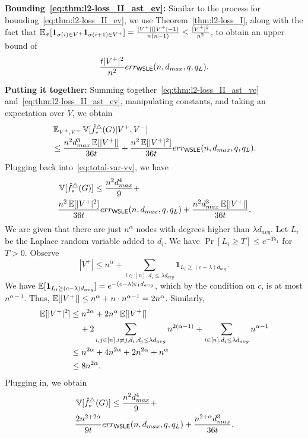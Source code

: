 \noindent\textbf{Bounding~\eqref{eq:thm:l2-loss_II_ast_ev}:}
Similar to the process for bounding~\eqref{eq:thm:l2-loss_II_ev}, we use
Theorem~\ref{thm:l2-loss_I}, along with the fact that
$\operatorname{\mathbb{E}}_\sigma[\textbf{1}_{\sigma(i) \in V^+} \textbf{1}_{\sigma(i+1) \in V^+}] =
\frac{|V^+|(|V^+|-1)}{n(n-1)} \leq \frac{|V^+|^2}{n^2}$, to obtain an upper bound of
\[
\frac{t|V^+|^2}{n^2} err_{\textsf{WSLE}}(n,d_{max},q,q_L).
\]

\noindent\textbf{Putting it together:}
Summing together~\eqref{eq:thm:l2-loss_II_ast_ve}
and~\eqref{eq:thm:l2-loss_II_ast_ev},
manipulating constants, and taking an expectation over $V$, we obtain
\begin{align*}
  &\operatorname{\mathbb{E}}_{V^+,V^-}\operatorname{\mathbb{V}}[\hat{f}_*^\triangle(G)|V^+,V^-] \\
  &\leq \frac{n^2 d_{max}^3 \operatorname{\mathbb{E}}[|V^+|]}{36t} +
  \frac{n^2\operatorname{\mathbb{E}}[|V^+|^2]}{36t}err_{\textsf{WSLE}}(n, d_{max}, q, q_L).
\end{align*}
Plugging back into~\eqref{eq:total-var-vv}, we have
\begin{align*}
  &\operatorname{\mathbb{V}}[\hat{f}_*^\triangle(G)] \leq \frac{n^2 d_{max}^4}{9} + \\
  &\frac{n^2\operatorname{\mathbb{E}}[|V^+|^2]}{36t}err_{\textsf{WSLE}}(n,d_{max},q,q_L) + \frac{n^2
  d_{max}^3 \operatorname{\mathbb{E}}[|V^+|]}{36t}.
\end{align*}
We are given that there are just $n^\alpha$ nodes with degrees higher than $\lambda
d_{avg}$. 
Let $L_i$ be the Laplace random variable added to $d_i$.
We have $\Pr[L_i \geq T] \leq e^{-T \epsilon_1}$ for $T > 0$.
Observe
\[
  |V^+| \leq n^\alpha + \sum_{i \in [n], d_i \leq \lambda d_{avg}}
  \textbf{1}_{L_i \geq (c-\lambda) d_{avg}}.
\]
We have $\operatorname{\mathbb{E}}[\textbf{1}_{L_i \geq (c-\lambda) d_{avg}}] =
e^{-(c-\lambda)\varepsilon_1 d_{avg}}$, which by the condition on $c$, is at most
$n^{\alpha-1}$. Thus, 
$\operatorname{\mathbb{E}}[|V^+|] \leq n^{\alpha} + n \cdot  n^{\alpha-1} = 2 n^{\alpha}$. 
Similarly, 
\begin{align*}
  \operatorname{\mathbb{E}}[|V^+|^2] &\leq n^{2\alpha} + 2n^{\alpha} \operatorname{\mathbb{E}}[|V^+|] \\& \hspace{4mm}+2\sum_{i,j \in [n], i \ne j, d_i,d_j \leq \lambda d_{avg}} n^{2(\alpha-1)} + \sum_{i \in [n], d_i \leq
  \lambda d_{avg}} n^{\alpha-1} \\
  &\leq n^{2\alpha} + 4n^{2\alpha} + 2n^{2\alpha} + n^\alpha \\
  &\leq 8n^{2\alpha}.
\end{align*}
Plugging in, we obtain
\begin{align*}
  &\operatorname{\mathbb{V}}[\hat{f}_*^\triangle(G)] \leq \frac{n^2 d_{max}^4}{9} + \\
  &\frac{2n^{2+2\alpha}}{9t}err_{\textsf{WSLE}}(n,d_{max},q,q_L) + \frac{n^{2+\alpha}
  d_{max}^3 }{36t}.
\end{align*}

